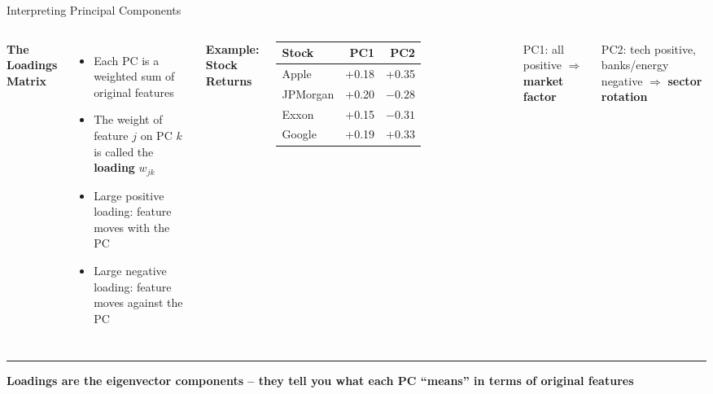 \documentclass[8pt,aspectratio=169]{beamer}
\newcommand{\bottomnote}[1]{%
\vfill
\vspace{-2mm}
\textcolor{mllavender2}{\rule{\textwidth}{0.4pt}}
\vspace{1mm}
\footnotesize
\textbf{#1}
}
\newenvironment{compactlist}{%
  \begin{itemize}%
    \setlength{\itemsep}{2pt}%
    \setlength{\parskip}{0pt}%
    \setlength{\parsep}{0pt}%
}{%
  \end{itemize}%
}
\newcommand{\highlight}[1]{\textcolor{mlorange}{\textbf{#1}}}
\begin{document}
\begin{frame}[t]{Interpreting Principal Components}
\begin{columns}[T]
\small
\textbf{The Loadings Matrix}
\begin{compactlist}
\item Each PC is a weighted sum of original features
\item The weight of feature $j$ on PC $k$ is called the \highlight{loading} $w_{jk}$
\item Large positive loading: feature moves with the PC
\item Large negative loading: feature moves against the PC
\end{compactlist}

\vspace{2mm}
\footnotesize
\textbf{Example: Stock Returns}

\vspace{2mm}
\begin{tabular}{@{}l r r@{}}
\toprule
\textbf{Stock} & \textbf{PC1} & \textbf{PC2} \\
\midrule
\rowcolor{mllavender4}
Apple & +0.18 & +0.35 \\
JPMorgan & +0.20 & $-0.28$ \\
\rowcolor{mllavender4}
Exxon & +0.15 & $-0.31$ \\
Google & +0.19 & +0.33 \\
\bottomrule
\end{tabular}

\vspace{2mm}
\scriptsize PC1: all positive $\Rightarrow$ \textbf{market factor}

PC2: tech positive, banks/energy negative $\Rightarrow$ \textbf{sector rotation}
\end{columns}

\bottomnote{Loadings are the eigenvector components -- they tell you what each PC ``means'' in terms of original features}
\end{frame}

\end{document}
